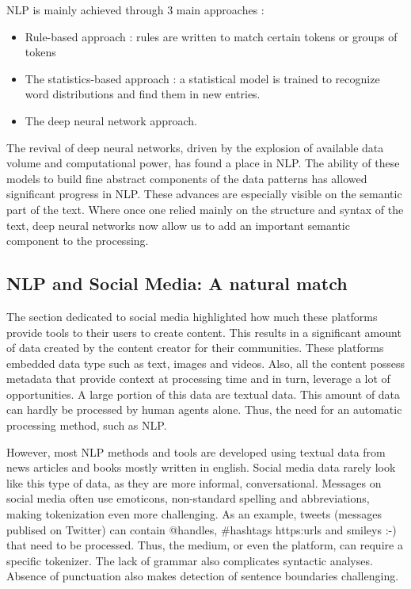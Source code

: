 NLP is mainly achieved through 3 main approaches \parencite{hirschbergAdvancesNaturalLanguage2015}:

\begin{itemize}
    \item Rule-based approach : rules are written to match certain tokens or groups of tokens
    \item The statistics-based approach : a statistical model is trained to recognize word distributions and find them in new entries.
    \item The deep neural network approach.
\end{itemize}

The revival of deep neural networks, driven by the explosion of available data volume and computational power, has found a place in NLP.
The ability of these models to build fine abstract components of the data patterns has allowed significant progress in NLP.
These advances are especially visible on the semantic part of the text.
Where once one relied mainly on the structure and syntax of the text, deep neural networks now allow us to add an important semantic component to the processing.

\subsection{NLP and Social Media: A natural match}
The section dedicated to social media highlighted how much these platforms provide tools to their users to create content.
This results in a significant amount of data created by the content creator for their communities.  %
These platforms embedded data type such as text, images and videos.
Also, all the content possess metadata that provide context at processing time and in turn, leverage a lot of opportunities.
A large portion of this data are textual data.
This amount of data can hardly be processed by human agents alone.
Thus, the need for an automatic processing method, such as NLP.

However, most NLP methods and tools are developed using textual data from news articles and books mostly written in english.
Social media data rarely look like this type of data, as they are more informal, conversational.
Messages on social media often use emoticons, non-standard spelling and abbreviations, making tokenization even more challenging.
As an example, tweets (messages publised on Twitter) can contain @handles, \#hashtags https:\/\/urls and smileys :-) that need to be processed.
Thus, the medium, or even the platform, can require a specific tokenizer.
The lack of grammar also complicates syntactic analyses.
Absence of punctuation also makes detection of sentence boundaries challenging.

